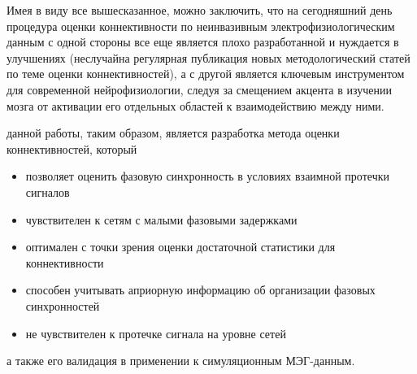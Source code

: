 
Имея в виду все вышесказанное, можно заключить, что на сегодняшний день
процедура оценки коннективности по неинвазивным электрофизиологическим данным с одной стороны
все еще является плохо разработанной и нуждается в улучшениях (неслучайна
регулярная публикация новых методологический статей по теме оценки коннективностей),
а с другой является ключевым инструментом для современной нейрофизиологии,
следуя за смещением акцента в изучении мозга от активации его отдельных областей к взаимодействию 
между ними.

{\aim} данной работы, таким образом, является разработка метода
оценки коннективностей, который
\begin{itemize}
        \item позволяет оценить фазовую синхронность в условиях взаимной протечки сигналов
        \item чувствителен к сетям с малыми фазовыми задержками
        \item оптимален с точки зрения оценки достаточной статистики для коннективности
        \item способен учитывать априорную информацию об организации фазовых синхронностей
        \item не чувствителен к протечке сигнала на уровне сетей
\end{itemize}
а также его валидация в применении к симуляционным МЭГ-данным.

